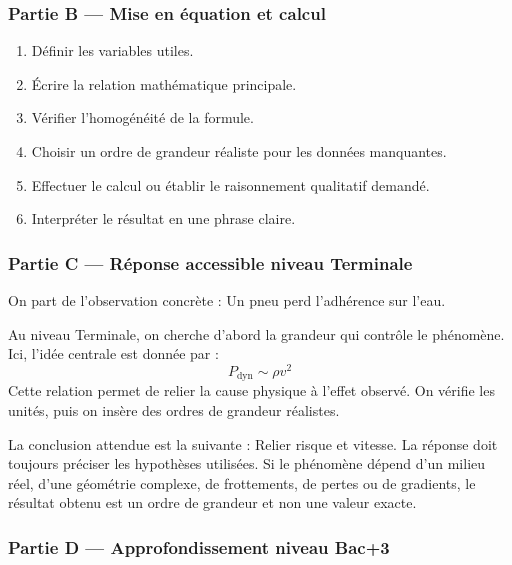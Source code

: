 \documentclass[11pt,a4paper]{article}
\begin{document}
\subsubsection*{Partie B — Mise en équation et calcul}

\begin{enumerate}
  \item Définir les variables utiles.
  \item Écrire la relation mathématique principale.
  \item Vérifier l'homogénéité de la formule.
  \item Choisir un ordre de grandeur réaliste pour les données manquantes.
  \item Effectuer le calcul ou établir le raisonnement qualitatif demandé.
  \item Interpréter le résultat en une phrase claire.
\end{enumerate}

\subsubsection*{Partie C — Réponse accessible niveau Terminale}

\begin{corrigebox}
On part de l'observation concrète : Un pneu perd l'adhérence sur l'eau.

Au niveau Terminale, on cherche d'abord la grandeur qui contrôle le phénomène. Ici, l'idée centrale est donnée par :
\[
P_{\mathrm{dyn}}\sim\rho v^2
\]
Cette relation permet de relier la cause physique à l'effet observé. On vérifie les unités, puis on insère des ordres de grandeur réalistes.

La conclusion attendue est la suivante : Relier risque et vitesse. La réponse doit toujours préciser les hypothèses utilisées. Si le phénomène dépend d'un milieu réel, d'une géométrie complexe, de frottements, de pertes ou de gradients, le résultat obtenu est un ordre de grandeur et non une valeur exacte.
\end{corrigebox}

\subsubsection*{Partie D — Approfondissement niveau Bac+3}
\end{document}
